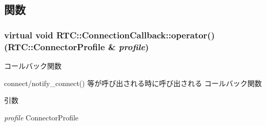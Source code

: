 \subsection{関数}
\subsubsection[{operator()}]{\setlength{\rightskip}{0pt plus 5cm}virtual void RTC::ConnectionCallback::operator() (RTC::ConnectorProfile \& {\em profile})\hspace{0.3cm}{\ttfamily  [pure virtual]}}\label{classRTC_1_1ConnectionCallback_ab28717e4f965c2ddbf89eb4d5f27b0ac}


コールバック関数 

connect/notify\_\-connect() 等が呼び出される時に呼び出される コールバック関数


\begin{DoxyParams}{引数}
\item[{\em profile}]ConnectorProfile \end{DoxyParams}
